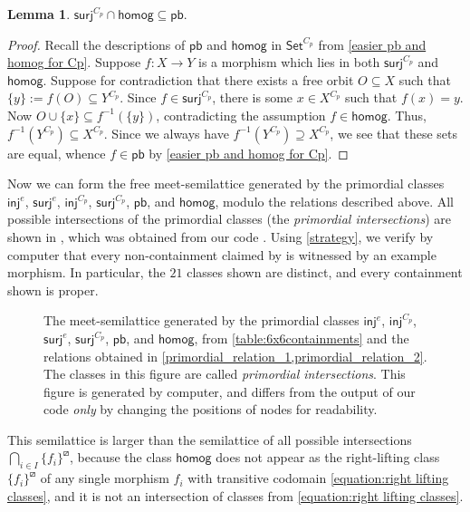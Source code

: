 \documentclass{amsart}
\newcommand{\Set}{\mathsf{Set}}
\newcommand{\CpSet}{\Set^{C_p}}
\newcommand{\rlp}[1]{{#1}^{\boxslash}}
\newcommand{\inj}{\mathsf{inj}}
\newcommand{\surj}{\mathsf{surj}}
\newcommand{\pb}{\mathsf{pb}}
\newcommand{\homog}{\mathsf{homog}}
\numberwithin{equation}{section}
\newtheorem{lemma}[equation]{Lemma}
\theoremstyle{definition}
\begin{document}
\begin{lemma}
	\label{primordial_relation_2}
	$\surj^{C_p} \cap \homog \subseteq \pb.$
\end{lemma}

\begin{proof}
	Recall the descriptions of $\pb$ and $\homog$ in $\CpSet$ from \cref{easier pb and homog for Cp}. Suppose $f : X \to Y$ is a morphism which lies in both $\surj^{C_p}$ and $\homog$. Suppose for contradiction that there exists a free orbit $O \subseteq X$ such that $\{y\} := f(O) \subseteq Y^{C_p}$. Since $f \in \surj^{C_p}$, there is some $x \in X^{C_p}$ such that $f(x) = y$. Now $O \cup \{x\} \subseteq f^{-1}(\{y\})$, contradicting the assumption $f \in \homog$. Thus, $f^{-1}(Y^{C_p}) \subseteq X^{C_p}$. Since we always have $f^{-1}(Y^{C_p}) \supseteq X^{C_p}$, we see that these sets are equal, whence $f \in \pb$ by \cref{easier pb and homog for Cp}.
\end{proof}

Now we can form the free meet-semilattice generated by the primordial classes $\inj^e$, $\surj^e$, $\inj^{C_p}$, $\surj^{C_p}$, $\pb$, and $\homog$, modulo the relations described above. All possible intersections of the primordial classes (the \textit{primordial intersections}) are shown in , which was obtained from our code \cite{code}. Using \cref{strategy}, we verify by computer that every non-containment claimed by  is witnessed by an example morphism. In particular, the $21$ classes shown are distinct, and every containment shown is proper.

\begin{figure}[p]
	
	\caption{The meet-semilattice generated by the primordial classes $\inj^e$, $\inj^{C_p}$, $\surj^e$, $\surj^{C_p}$, $\pb$, and $\homog$, from \cref{table:6x6containments} and the relations obtained in \cref{primordial_relation_1,primordial_relation_2}. The classes in this figure are called \textit{primordial intersections}. This figure is generated by computer, and differs from the output of our code \textit{only} by changing the positions of nodes for readability.}
	\label{fig:primordial_meet_semilattice}
\end{figure}

This semilattice is larger than the semilattice of all possible intersections $\bigcap_{i \in I} \rlp{\{f_i\}}$, because the class $\homog$ does not appear as the right-lifting class $\rlp{\{f_i\}}$ of any single morphism $f_i$ with transitive codomain \cref{equation:right lifting classes}, and it is not an intersection of classes from \cref{equation:right lifting classes}. 
\end{document}
